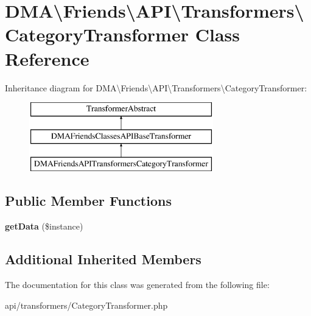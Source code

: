 \hypertarget{classDMA_1_1Friends_1_1API_1_1Transformers_1_1CategoryTransformer}{}\section{D\+M\+A\textbackslash{}Friends\textbackslash{}A\+P\+I\textbackslash{}Transformers\textbackslash{}Category\+Transformer Class Reference}
\label{classDMA_1_1Friends_1_1API_1_1Transformers_1_1CategoryTransformer}
Inheritance diagram for D\+M\+A\textbackslash{}Friends\textbackslash{}A\+P\+I\textbackslash{}Transformers\textbackslash{}Category\+Transformer\+:\begin{figure}[H]
\begin{center}
\leavevmode
\includegraphics[height=3.000000cm]{dd/d14/classDMA_1_1Friends_1_1API_1_1Transformers_1_1CategoryTransformer}
\end{center}
\end{figure}
\subsection*{Public Member Functions}
\begin{DoxyCompactItemize}
\item 
\hypertarget{classDMA_1_1Friends_1_1API_1_1Transformers_1_1CategoryTransformer_a67f413e3b721931ff37c26a51b108e61}{}{\bfseries get\+Data} (\$instance)\label{classDMA_1_1Friends_1_1API_1_1Transformers_1_1CategoryTransformer_a67f413e3b721931ff37c26a51b108e61}

\end{DoxyCompactItemize}
\subsection*{Additional Inherited Members}


The documentation for this class was generated from the following file\+:\begin{DoxyCompactItemize}
\item 
api/transformers/Category\+Transformer.\+php\end{DoxyCompactItemize}
